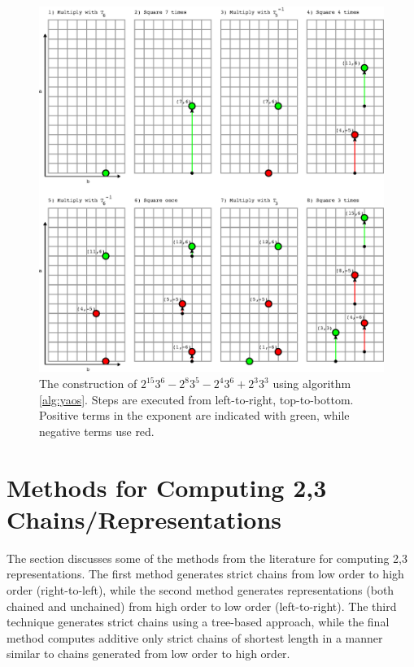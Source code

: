 \documentclass{ucalgthes1}
\theoremstyle{definition}
\begin{document}
\begin{figure}[H]
\centering
\includegraphics{yao1}
\caption[The construction of $2^{15} 3^6 - 2^8 3^5 - 2^4 3^6 + 2^3 3^3$.]{The construction of $2^{15} 3^6 - 2^8 3^5 - 2^4 3^6 + 2^3 3^3$ using algorithm \ref{alg:yaos}.  Steps are executed from left-to-right, top-to-bottom.  Positive terms in the exponent are indicated with green, while negative terms use red.}
\label{fig:yao1}
\end{figure}


\section{Methods for Computing 2,3 Chains/Representations}
\label{sec:dbnsMethods}

The section discusses some of the methods from the literature for computing 2,3 representations. The first method generates strict chains from low order to high order (right-to-left), while the second method generates representations (both chained and unchained) from high order to low order (left-to-right).  The third technique generates strict chains using a tree-based approach, while the final method computes additive only strict chains of shortest length in a manner similar to chains generated from low order to high order.  
\end{document}
